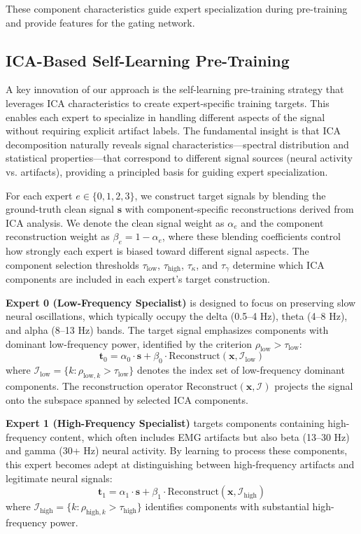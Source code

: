 \documentclass{article}
\begin{document}
These component characteristics guide expert specialization during pre-training and provide features for the gating network.

\subsection{ICA-Based Self-Learning Pre-Training}

A key innovation of our approach is the self-learning pre-training strategy that leverages ICA characteristics to create expert-specific training targets. This enables each expert to specialize in handling different aspects of the signal without requiring explicit artifact labels. The fundamental insight is that ICA decomposition naturally reveals signal characteristics---spectral distribution and statistical properties---that correspond to different signal sources (neural activity vs. artifacts), providing a principled basis for guiding expert specialization.

For each expert $e \in \{0, 1, 2, 3\}$, we construct target signals by blending the ground-truth clean signal $\mathbf{s}$ with component-specific reconstructions derived from ICA analysis. We denote the clean signal weight as $\alpha_e$ and the component reconstruction weight as $\beta_e = 1 - \alpha_e$, where these blending coefficients control how strongly each expert is biased toward different signal aspects. The component selection thresholds $\tau_{\text{low}}$, $\tau_{\text{high}}$, $\tau_{\kappa}$, and $\tau_{\gamma}$ determine which ICA components are included in each expert's target construction.

\textbf{Expert 0 (Low-Frequency Specialist)} is designed to focus on preserving slow neural oscillations, which typically occupy the delta (0.5--4 Hz), theta (4--8 Hz), and alpha (8--13 Hz) bands. The target signal emphasizes components with dominant low-frequency power, identified by the criterion $\rho_{\text{low}} > \tau_{\text{low}}$:
\begin{equation}
\mathbf{t}_0 = \alpha_0 \cdot \mathbf{s} + \beta_0 \cdot \text{Reconstruct}(\mathbf{x}, \mathcal{I}_{\text{low}})
\end{equation}
where $\mathcal{I}_{\text{low}} = \{k : \rho_{\text{low},k} > \tau_{\text{low}}\}$ denotes the index set of low-frequency dominant components. The reconstruction operator $\text{Reconstruct}(\mathbf{x}, \mathcal{I})$ projects the signal onto the subspace spanned by selected ICA components.

\textbf{Expert 1 (High-Frequency Specialist)} targets components containing high-frequency content, which often includes EMG artifacts but also beta (13--30 Hz) and gamma (30+ Hz) neural activity. By learning to process these components, this expert becomes adept at distinguishing between high-frequency artifacts and legitimate neural signals:
\begin{equation}
\mathbf{t}_1 = \alpha_1 \cdot \mathbf{s} + \beta_1 \cdot \text{Reconstruct}(\mathbf{x}, \mathcal{I}_{\text{high}})
\end{equation}
where $\mathcal{I}_{\text{high}} = \{k : \rho_{\text{high},k} > \tau_{\text{high}}\}$ identifies components with substantial high-frequency power.
\end{document}
